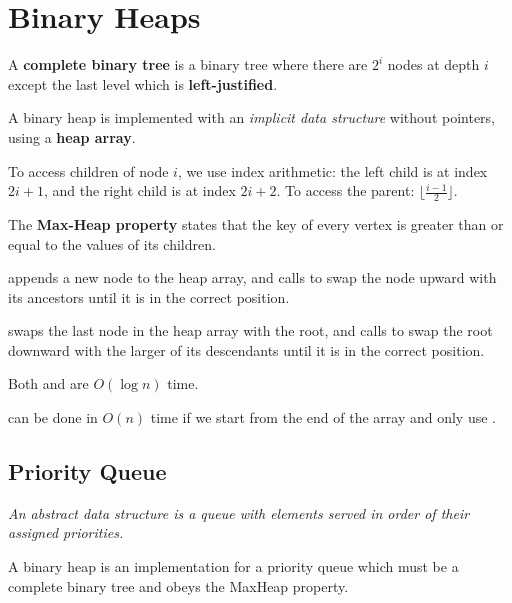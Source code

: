 \section{Binary Heaps}
A \textbf{complete binary tree} is a binary tree where there are $2^i$ nodes at depth $i$
except the last level which is \textbf{left-justified}.

A binary heap is implemented with an \emph{implicit data structure} without pointers,
using a \textbf{heap array}.

To access children of node $i$, we use index arithmetic:
the left child is at index $2i+1$,
and the right child is at index $2i+2$.
To access the parent: $\lfloor \frac{i-1}{2} \rfloor$.

The \textbf{Max-Heap property} states that the key of every vertex is greater than or equal to the values of its children.

 appends a new node to the heap array, 
and calls  to swap the node upward with its ancestors until it is in the correct position.

 swaps the last node in the heap array with the root, 
and calls  to swap the root downward with the larger of its descendants until it is in the correct position.

Both  and  are $O(\log n)$ time.

 can be done in $O(n)$ time if we start from the end of the array and only use .

\subsection{Priority Queue}
\emph{An abstract data structure is a queue with elements served in order of their assigned priorities.}

A binary heap is an implementation for a priority queue which must be a complete binary tree and 
obeys the MaxHeap property.